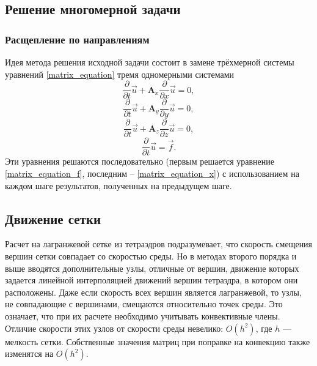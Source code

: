 \subsection{Решение многомерной задачи}

\subsubsection{Расщепление по направлениям}
Идея метода \cite{fedorenko} решения исходной задачи состоит в замене трёхмерной системы
уравнений \ref{matrix_equation} тремя одномерными системами 
\begin{equation}
\frac{\partial}{\partial t}\vec u+\mathbf{A}_x \frac{\partial}{\partial x}\vec u
= 0,
\label{matrix_equation_x}
\end{equation}
\begin{equation}
\frac{\partial}{\partial t}\vec u+\mathbf{A}_y \frac{\partial}{\partial y}\vec u
= 0,
\label{matrix_equation_y}
\end{equation}
\begin{equation}
\frac{\partial}{\partial t}\vec u+\mathbf{A}_z \frac{\partial}{\partial z}\vec u
= 0,
\label{matrix_equation_z}
\end{equation}
\begin{equation}
\frac{\partial}{\partial t}\vec u = \vec f.
\label{matrix_equation_f}
\end{equation}
Эти уравнения решаются последовательно (первым решается уравнение
\ref{matrix_equation_f}, последним -- \ref{matrix_equation_x}) с использованием
на каждом шаге результатов, полученных на предыдущем шаге.


\subsection{Движение сетки}



Расчет на лагранжевой сетке из тетраэдров подразумевает, что скорость 
смещения вершин сетки совпадает со скоростью среды. Но в методах 
второго порядка и выше вводятся дополнительные узлы, отличные от
вершин, движение которых задается линейной интерполяцией движений
вершин тетраэдра, в котором они расположены. Даже если скорость
всех вершин является лагранжевой, то узлы, не совпадающие с вершинами, 
смещаются относительно точек среды. Это означает, что при их расчете
необходимо учитывать конвективные члены. Отличие скорости этих узлов
от скорости среды невелико: $O(h^2)$, где $h$ — мелкость сетки. Собственные
значения матриц при поправке на конвекцию также изменятся на $O(h^2)$.

